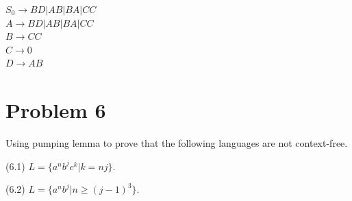 \documentclass[11pt]{article}
\begin{document}
$S_0 \rightarrow BD | AB | BA | CC$\\
$A \rightarrow BD | AB | BA | CC$\\
$B \rightarrow CC$\\
$C \rightarrow 0$\\
$D \rightarrow AB$

\newpage
\section*{Problem 6}

\noindent
Using pumping lemma to prove that the following languages are not
context-free.

(6.1) $L=\{a^nb^jc^k|k=nj\}$.
\newline

(6.2) $L=\{a^nb^j|n\geq (j-1)^3\}$.
\newline
\end{document}

